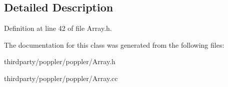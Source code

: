 \subsection{Detailed Description}


Definition at line 42 of file Array.\+h.



The documentation for this class was generated from the following files\+:\begin{DoxyCompactItemize}
\item 
thirdparty/poppler/poppler/Array.\+h\item 
thirdparty/poppler/poppler/Array.\+cc\end{DoxyCompactItemize}
